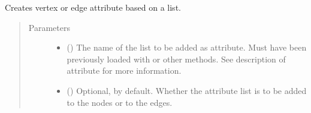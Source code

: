 \documentclass[letterpaper,10pt,english]{sphinxmanual}
\begin{document}
\begin{fulllineitems}
\begin{fulllineitems}
\end{fulllineitems}


\begin{fulllineitems}
\label{\detokenize{main:pypath.main.PyPath.all_neighbours}}
\end{fulllineitems}


\begin{fulllineitems}
\label{\detokenize{main:pypath.main.PyPath.apply_list}}
Creates vertex or edge attribute based on a list.
\begin{quote}\begin{description}
\item[{Parameters}] \leavevmode\begin{itemize}
\item {} 
 () \textendash{} The name of the list to be added as attribute. Must have
been previously loaded with
{\hyperref[\detokenize{main:pypath.main.PyPath.load_list}]{}} or other methods.
See description of 
attribute for more information.

\item {} 
 () \textendash{} Optional,  by default. Whether the attribute list
is to be added to the nodes or to the edges.

\end{itemize}

\end{description}\end{quote}

\end{fulllineitems}


\begin{fulllineitems}
\label{\detokenize{main:pypath.main.PyPath.apply_negative}}
\end{fulllineitems}


\end{fulllineitems}
\end{document}
